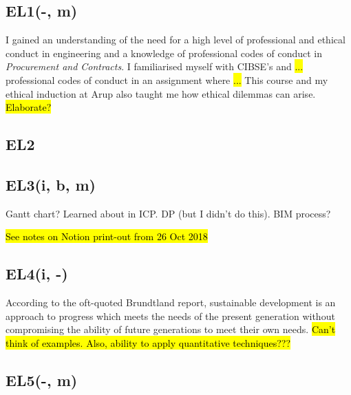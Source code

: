 \subsection*{EL1(-, m)}

I gained an understanding of the need for a high level of professional and ethical conduct in engineering and a knowledge of professional codes of conduct in \textit{Procurement and Contracts}.
I familiarised myself with CIBSE's and \hl{...} professional codes of conduct in an assignment where \hl{...}
This course and my ethical induction at Arup also taught me how ethical dilemmas can arise.
\hl{Elaborate?}


\subsection*{EL2}


\subsection*{EL3(i, b, m)}

Gantt chart? Learned about in ICP.
DP (but I didn't do this).
BIM process?

\hl{See notes on Notion print-out from 26 Oct 2018}


\subsection*{EL4(i, -)}

According to the oft-quoted Brundtland report, sustainable development is an approach to progress which meets the needs of the present generation without compromising the ability of future generations to meet their own needs.
\hl{Can't think of examples. Also, ability to apply quantitative techniques???}



\subsection*{EL5(-, m)}

